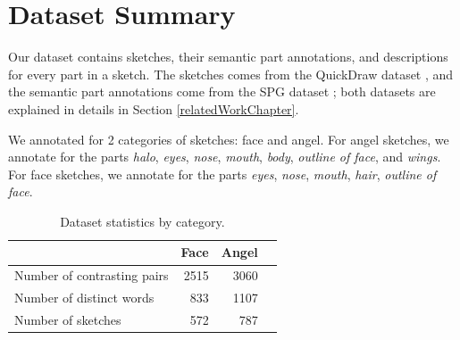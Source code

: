 \section{Dataset Summary} \label{datasummary}
Our dataset contains sketches, their semantic part annotations, and descriptions for every part in a sketch. 
The sketches comes from the QuickDraw dataset \citep{ha2017neural}, and the semantic part annotations come from the SPG dataset \citep{spg_paper}; both datasets are explained in details in Section \ref{relatedWorkChapter}.

We annotated for 2 categories of sketches: face and angel. 
For angel sketches, we annotate for the parts \textit{halo}, \textit{eyes}, \textit{nose}, \textit{mouth}, \textit{body}, \textit{outline of face}, and \textit{wings}. 
For face sketches, we annotate for the parts \textit{eyes}, \textit{nose}, \textit{mouth}, \textit{hair}, \textit{outline of face}. 


\begin{table}[!htb]
\begin{minipage}{1\textwidth}
\begin{center}
{\small
\begin{tabular}{lrrr}
\toprule
~ & Face & Angel \\
\midrule
Number of contrasting pairs & 2515 & 3060 \\
Number of distinct words & 833 & 1107 \\
Number of sketches & 572 & 787 \\
\bottomrule
\end{tabular}}
\caption{Dataset statistics by category.}
\label{table:dataset_stats1}
\end{center}
\end{minipage}
\end{table}

